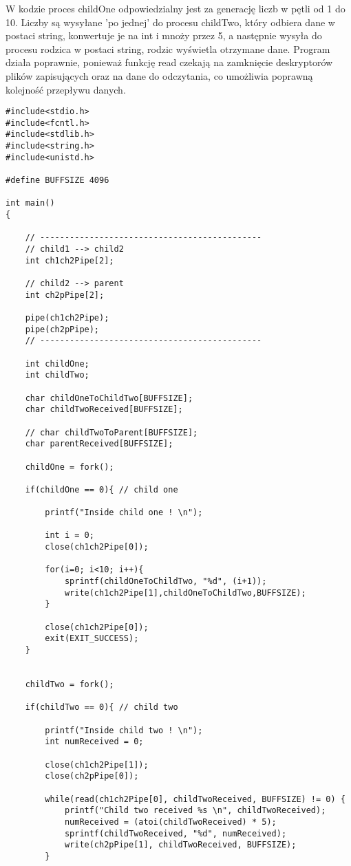 \documentclass[a4paper,15pt]{article}
\begin{document}
W kodzie proces childOne odpowiedzialny jest za generację liczb w pętli od 1 do 10. Liczby są wysyłane 'po jednej' do procesu childTwo, który odbiera dane w postaci string, konwertuje je na int i mnoży przez 5, a następnie wysyła do procesu rodzica w postaci string, rodzic wyświetla otrzymane dane. Program działa poprawnie, ponieważ funkcję read czekają na zamknięcie deskryptorów plików zapisujących oraz na dane do odczytania, co umożliwia poprawną kolejność przepływu danych.
\begin{lstlisting}[style=CStyle, label=some-code, caption=Przekazywanie danych przez kilka łączy.]
#include<stdio.h>
#include<fcntl.h>
#include<stdlib.h>
#include<string.h>
#include<unistd.h>

#define BUFFSIZE 4096

int main()
{

    // ---------------------------------------------
    // child1 --> child2
    int ch1ch2Pipe[2];

    // child2 --> parent
    int ch2pPipe[2];
    
    pipe(ch1ch2Pipe);
    pipe(ch2pPipe);
    // ---------------------------------------------

    int childOne;
    int childTwo;

    char childOneToChildTwo[BUFFSIZE];
    char childTwoReceived[BUFFSIZE];

    // char childTwoToParent[BUFFSIZE];
    char parentReceived[BUFFSIZE];
    
    childOne = fork();

    if(childOne == 0){ // child one

        printf("Inside child one ! \n");

        int i = 0;
        close(ch1ch2Pipe[0]);

        for(i=0; i<10; i++){
            sprintf(childOneToChildTwo, "%d", (i+1));
            write(ch1ch2Pipe[1],childOneToChildTwo,BUFFSIZE);
        }

        close(ch1ch2Pipe[0]);
        exit(EXIT_SUCCESS);
    }
    

    childTwo = fork();

    if(childTwo == 0){ // child two

        printf("Inside child two ! \n");
        int numReceived = 0;

        close(ch1ch2Pipe[1]);
        close(ch2pPipe[0]);

        while(read(ch1ch2Pipe[0], childTwoReceived, BUFFSIZE) != 0) {
            printf("Child two received %s \n", childTwoReceived);
            numReceived = (atoi(childTwoReceived) * 5);
            sprintf(childTwoReceived, "%d", numReceived);
            write(ch2pPipe[1], childTwoReceived, BUFFSIZE);
        }
        

\end{lstlisting}
\end{document}
